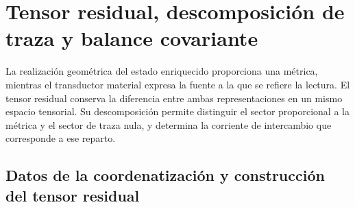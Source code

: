 %

\section{Tensor residual, descomposición de traza y balance covariante}
\label{vii:sec:tensor-residual-balance}

La realización geométrica del estado enriquecido proporciona una métrica,
mientras el transductor material expresa la fuente a la que se refiere la
lectura. El tensor residual conserva la diferencia entre ambas representaciones
en un mismo espacio tensorial. Su descomposición permite distinguir el
sector proporcional a la métrica y el sector de traza nula, y determina
la corriente de intercambio que corresponde a ese reparto.

\subsection{Datos de la coordenatización y construcción del tensor residual}
\label{vii:subsec:datos-tensor-residual}

